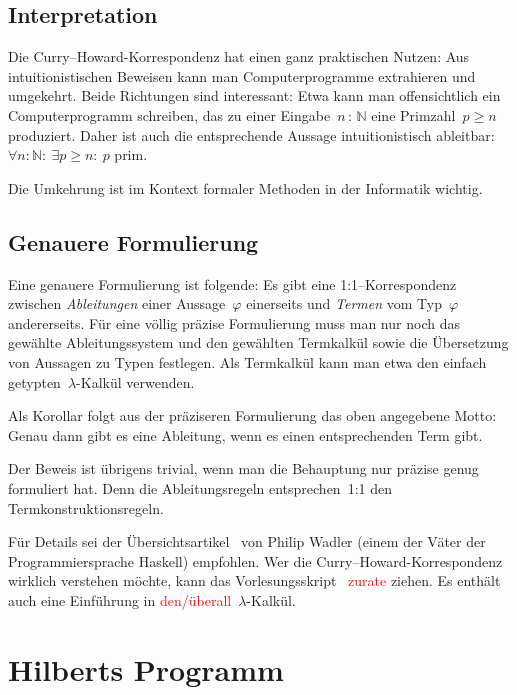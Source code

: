 \documentclass[a4paper,ngerman,12pt]{scrartcl}
\theoremstyle{definition}
\theoremstyle{plain}
\theoremstyle{remark}
\newcommand{\NN}{\mathbb{N}}
\renewcommand{\_}{\mathpunct{.}\,}
\newcommand{\?}{\,{:}\,}
\newcommand{\XXX}[1]{\textcolor{red}{#1}}
\begin{document}
\subsection{Interpretation}

Die Curry--Howard-Korrespondenz hat einen ganz praktischen Nutzen: Aus
intuitionistischen Beweisen kann man Computerprogramme extrahieren und
umgekehrt. Beide Richtungen sind interessant: Etwa kann man offensichtlich ein
Computerprogramm schreiben, das zu einer Eingabe~$n \? \NN$ eine Primzahl~$p
\geq n$ produziert. Daher ist auch die entsprechende Aussage intuitionistisch
ableitbar:~$\forall n{:}\NN{:}\ \exists p \geq n{:}\ \text{$p$ prim}$.

Die Umkehrung ist im Kontext formaler Methoden in der Informatik wichtig.


\subsection{Genauere Formulierung}

Eine genauere Formulierung ist folgende: Es gibt eine 1:1--Korrespondenz
zwischen \emph{Ableitungen} einer Aussage~$\varphi$ einerseits und
\emph{Termen} vom Typ~$\varphi$ andererseits. Für eine völlig präzise
Formulierung muss man nur noch das gewählte Ableitungssystem und den gewählten
Termkalkül sowie die
Übersetzung von Aussagen zu Typen festlegen. Als Termkalkül kann man etwa den
einfach getypten~$\lambda$-Kalkül verwenden.

Als Korollar folgt aus der präziseren Formulierung das oben angegebene Motto:
Genau dann gibt es eine Ableitung, wenn es einen entsprechenden Term gibt.

Der Beweis ist übrigens trivial, wenn man die Behauptung nur präzise genug
formuliert hat. Denn die Ableitungsregeln entsprechen~1:1 den
Termkonstruktionsregeln.

Für Details sei der Übersichtsartikel~\cite{wadler:curry-howard} von Philip
Wadler (einem der Väter der Pro\-gram\-mier\-spra\-che Haskell) empfohlen. Wer die
Curry--Howard-Korrespondenz wirklich verstehen möchte, kann das
Vorlesungsskript~\cite{sorensen:urzyczyn:curryhoward} \XXX{zurate} ziehen. Es enthält
auch eine Einführung in \XXX{den/überall}~$\lambda$-Kalkül.


\section{Hilberts Programm}
\label{hilberts-programm}
\end{document}
